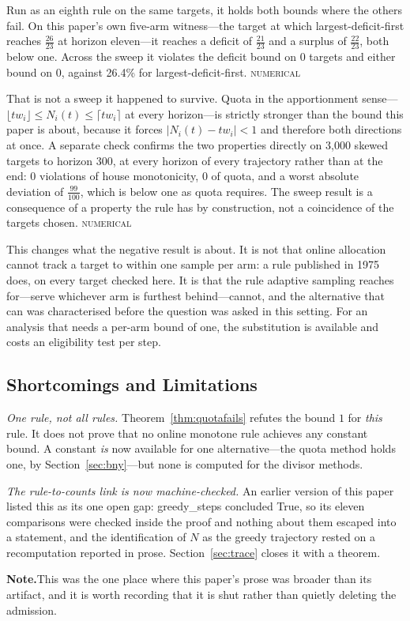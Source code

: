 \documentclass[conference]{IEEEtran}
\theoremstyle{definition}
\newcommand{\lean}[1]{\textsf{\footnotesize #1}}
\newcommand{\NUM}{\textsc{numerical}}
\newif\ifshownotes\shownotestrue
\newcommand{\NOTEPAR}[1]{\ifshownotes\par\vspace{2pt}\noindent%
  {\color{notecol}\textsf{\footnotesize\textbf{Note.}\;#1}}\par\vspace{2pt}\fi}
\begin{document}
Run as an eighth rule on the same targets, it holds both bounds where the others fail. On
this paper's own five-arm witness---the target at which largest-deficit-first reaches
$\tfrac{26}{23}$ at horizon eleven---it reaches a deficit of $\tfrac{21}{23}$ and a surplus of
$\tfrac{22}{23}$, both below one. Across the sweep it violates the deficit bound on
0 targets and either bound on 0, against 26.4\% for
largest-deficit-first. \NUM{}

That is not a sweep it happened to survive. Quota in the apportionment sense---$\lfloor t w_{i}\rfloor\le N_{i}(t)\le\lceil t w_{i}\rceil$ at
every horizon---is strictly stronger than the bound this paper is about, because it forces
$|N_{i}(t)-t w_{i}|<1$ and therefore both directions at once. A separate check confirms the
two properties directly on 3{,}000 skewed targets to horizon 300, at every horizon of every
trajectory rather than at the end: 0 violations of house monotonicity, 0 of
quota, and a worst absolute deviation of $\tfrac{99}{100}$, which is below one as quota requires.
The sweep result is a consequence of a property the rule has by construction, not a
coincidence of the targets chosen. \NUM{}

This changes what the negative result is about. It is not that online allocation cannot track
a target to within one sample per arm: a rule published in 1975 does, on every target checked
here. It is that the rule adaptive sampling reaches for---serve whichever arm is furthest
behind---cannot, and the alternative that can was characterised before the question was asked
in this setting. For an analysis that needs a per-arm bound of one, the substitution is
available and costs an eligibility test per step.

\subsection{Shortcomings and Limitations}

\emph{One rule, not all rules.} Theorem~\ref{thm:quotafails} refutes the bound $1$ for
\emph{this} rule. It does not prove that no online monotone rule achieves any constant bound.
A constant \emph{is} now available for one alternative---the quota method holds one, by
Section~\ref{sec:bny}---but none is computed for the divisor methods.

\emph{The rule-to-counts link is now machine-checked.} An earlier version of this paper
listed this as its one open gap: \lean{greedy\_steps} concluded \textsf{True}, so its eleven
comparisons were checked inside the proof and nothing about them escaped into a statement,
and the identification of $N$ as the greedy trajectory rested on a recomputation reported in
prose. Section~\ref{sec:trace} closes it with a theorem.
\NOTEPAR{This was the one place where this paper's prose was broader than its artifact, and
it is worth recording that it is shut rather than quietly deleting the admission.}
\end{document}
